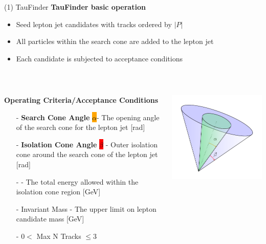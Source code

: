 \documentclass[10pt]{beamer}
\begin{document}
\begin{frame}{(1) TauFinder}
\textbf{TauFinder basic operation}\\
\begin{itemize}
\item Seed lepton jet candidates with tracks ordered by $|P|$\\
\item All particles within the search cone are added to the lepton jet\\
\item Each candidate is subjected to acceptance conditions \\
\end{itemize}
\quad \quad \\
\begin{columns}
\begin{column}{0.5\textwidth}
\scriptsize \textbf{Operating Criteria/Acceptance Conditions}
 \begin{itemize}
 \scriptsize
 	\item[-]\textbf{Search Cone Angle} \colorbox{orange}{$\alpha$}- The opening angle of the search cone for the lepton jet [rad]
 	\item[-] \textbf{Isolation Cone Angle} \colorbox{red}{$\beta$} - Outer isolation cone around the search cone of the lepton jet [rad]
 	\item[-]  - The total energy allowed within the isolation cone region [GeV]
 	\item[-]Invariant Mass - The upper limit on lepton candidate mass [GeV]
 	\item[-] $0 <$ Max N Tracks $\leq 3$
 \end{itemize}
\end{column}
\begin{column}{0.5\textwidth}
\includegraphics[scale=0.7]{cone.pdf}
\end{column}
\end{columns} 
 
\end{frame}
\end{document}
